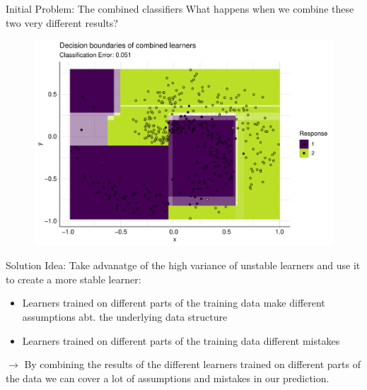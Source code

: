 \begin{vbframe}{Initial Problem: The combined classifiers}
What happens when we combine these two very different results?
\begin{figure}
\includegraphics[height=0.60\textheight, keepaspectratio]{figure/cart_forest_overview_2.pdf}
\end{figure}
\end{vbframe}

\begin{vbframe}{Solution}
Idea: Take advanatge of the high variance of unstable learners and use it to create a more stable learner: 
\begin{itemize}
  \item Learners trained on different parts of the training data make different assumptions abt. the 
  underlying data structure 
  \item Learners trained on different parts of the training data different mistakes
\end{itemize}
$\rightarrow$ By combining  the results of the different learners trained on different parts of the data we can cover a lot of assumptions and mistakes in our prediction. 
\end{vbframe}


